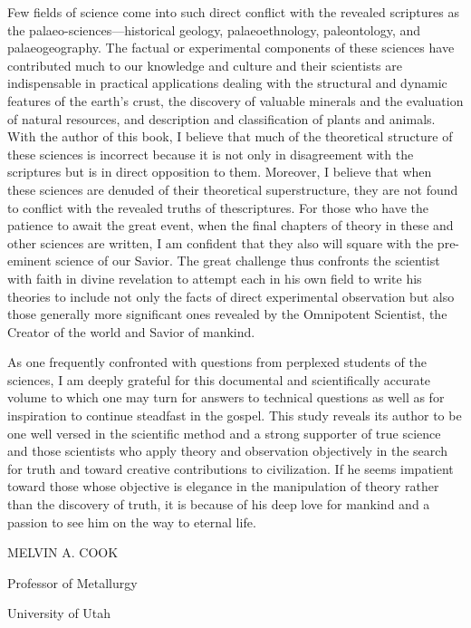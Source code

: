 Few fields of science come into such direct conflict with the revealed scriptures as the
palaeo-sciences—historical geology, palaeoethnology, paleontology, and palaeogeography.
The factual or experimental components of these sciences have contributed much to our
knowledge and culture and their scientists are indispensable in practical applications dealing
with the structural and dynamic features of the earth's crust, the discovery of valuable
minerals and the evaluation of natural resources, and description and classification of plants
and animals. With the author of this book, I believe that much of the theoretical structure of
these sciences is incorrect because it is not only in disagreement with the scriptures but is in
direct opposition to them. Moreover, I believe that when these sciences are denuded of their
theoretical superstructure, they are not found to conflict with the revealed truths of thescriptures.
For those who have the patience to await the great event, when the final chapters
of theory in these and other sciences are written, I am confident that they also will square
with the pre-eminent science of our Savior. The great challenge thus confronts the scientist
with faith in divine revelation to attempt each in his own field to write his theories to include
not only the facts of direct experimental observation but also those generally more significant
ones revealed by the Omnipotent Scientist, the Creator of the world and Savior of mankind.

As one frequently confronted with questions from perplexed students of the sciences, I am
deeply grateful for this documental and scientifically accurate volume to which one may turn
for answers to technical questions as well as for inspiration to continue steadfast in the
gospel. This study reveals its author to be one well versed in the scientific method and a
strong supporter of true science and those scientists who apply theory and observation
objectively in the search for truth and toward creative contributions to civilization. If he
seems impatient toward those whose objective is elegance in the manipulation of theory
rather than the discovery of truth, it is because of his deep love for mankind and a passion to
see him on the way to eternal life.

\vspace{\onelineskip}
MELVIN A. COOK

\vspace{\onelineskip}
Professor of Metallurgy

\vspace{\onelineskip}
University of Utah

